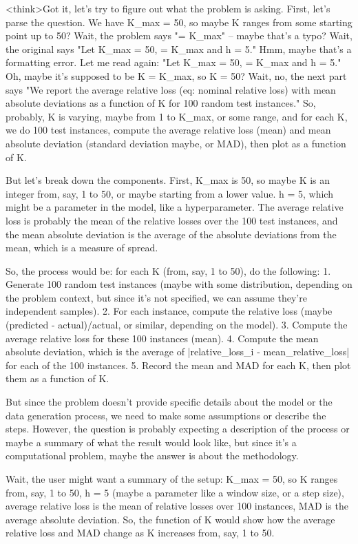 <think>Got it, let's try to figure out what the problem is asking. First, let's parse the question. We have K_max = 50, so maybe K ranges from some starting point up to 50? Wait, the problem says "= K_max" – maybe that's a typo? Wait, the original says "Let K_max = 50, = K_max and h = 5." Hmm, maybe that's a formatting error. Let me read again: "Let K_max = 50, = K_max and h = 5." Oh, maybe it's supposed to be K = K_max, so K = 50? Wait, no, the next part says "We report the average relative loss (eq: nominal relative loss) with mean absolute deviations as a function of K for 100 random test instances." So, probably, K is varying, maybe from 1 to K_max, or some range, and for each K, we do 100 test instances, compute the average relative loss (mean) and mean absolute deviation (standard deviation maybe, or MAD), then plot as a function of K.

But let's break down the components. First, K_max is 50, so maybe K is an integer from, say, 1 to 50, or maybe starting from a lower value. h = 5, which might be a parameter in the model, like a hyperparameter. The average relative loss is probably the mean of the relative losses over the 100 test instances, and the mean absolute deviation is the average of the absolute deviations from the mean, which is a measure of spread.

So, the process would be: for each K (from, say, 1 to 50), do the following:
1. Generate 100 random test instances (maybe with some distribution, depending on the problem context, but since it's not specified, we can assume they're independent samples).
2. For each instance, compute the relative loss (maybe (predicted - actual)/actual, or similar, depending on the model).
3. Compute the average relative loss for these 100 instances (mean).
4. Compute the mean absolute deviation, which is the average of |relative_loss_i - mean_relative_loss| for each of the 100 instances.
5. Record the mean and MAD for each K, then plot them as a function of K.

But since the problem doesn't provide specific details about the model or the data generation process, we need to make some assumptions or describe the steps. However, the question is probably expecting a description of the process or maybe a summary of what the result would look like, but since it's a computational problem, maybe the answer is about the methodology.

Wait, the user might want a summary of the setup: K_max = 50, so K ranges from, say, 1 to 50, h = 5 (maybe a parameter like a window size, or a step size), average relative loss is the mean of relative losses over 100 instances, MAD is the average absolute deviation. So, the function of K would show how the average relative loss and MAD change as K increases from, say, 1 to 50.

